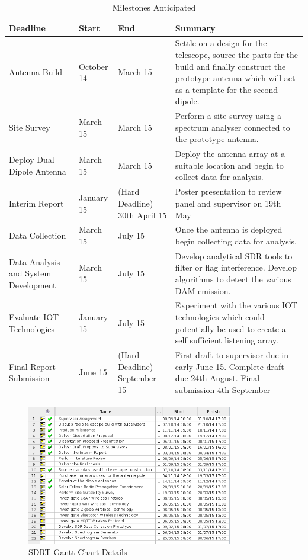 \documentclass[runningheads,a4paper]{llncs}
\begin{document}
%
\begin{table}
  \centering
  \begin{tabular}{ | p{2cm} | p{2cm} | p{2cm} | p{5cm} |}
    \hline
    Deadline & Start & End & Summary \\ \hline \hline
    Antenna Build & October 14 & March 15 & Settle on a design for the telescope, source the parts for the build
    and finally construct the prototype antenna which will act as a template for the second dipole. \\ \hline
    Site Survey & March 15 & March 15 & Perform a site survey using a spectrum analyser connected to the prototype antenna. \\ \hline
    Deploy Dual Dipole Antenna & March 15 & March 15 & Deploy the antenna array at a suitable location and begin to collect data for analysis. \\ \hline
    Interim Report & January 15 & (Hard Deadline) 30th April 15 & Poster presentation to review panel and supervisor on 19th May \\ \hline
    Data Collection & March 15 & July 15 & Once the antenna is deployed begin collecting data for analysis. \\ \hline
    Data Analysis and System Development & March 15 & July 15 & Develop analytical SDR tools to filter or flag interference. Develop algorithms to detect the various DAM emission. \\ \hline
    Evaluate IOT Technologies & January 15 & July 15 & Experiment with the various IOT technologies which could potentially be used to create a self sufficient listening array. \\ \hline
    Final Report Submission & June 15 & (Hard Deadline) September 15 & First draft to supervisor due in early June 15. Complete draft due 24th August. Final submission 4th September \\
    \hline
  \end{tabular}
  \caption{Milestones Anticipated}
  \label{tab:milestones_anticipated}
\end{table}
%

%
\begin{figure}[here]
	\centering
	\includegraphics[width=9cm]{images/56}
	\caption{SDRT Gantt Chart Details}
	\label{fig:sdrt-gantt}
\end{figure}
%
\end{document}
